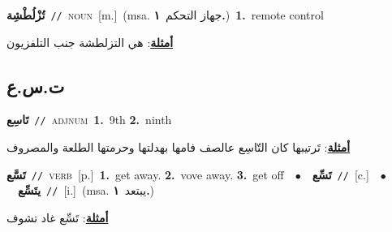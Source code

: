\documentclass[10pt,a4paper,twoside]{article} %
\begin{document}
\begin{multicols}{2}
{\setlength\topsep{0pt}\textbf{\foreignlanguage{arabic}{تُزْلُطْشِة}}\ {\color{gray}\texttt{//}\color{black}}\ \textsc{noun}\ [m.]\ \color{gray}(msa. \foreignlanguage{arabic}{جهاز التحكم}~\foreignlanguage{arabic}{\textbf{١.}})\color{black}\ \textbf{1.}~remote control\  \begin{flushright}\color{gray}\foreignlanguage{arabic}{\textbf{\underline{\foreignlanguage{arabic}{أمثلة}}}: هي التزلطشة جنب التلفزيون}\end{flushright}\color{black}} \vspace{2mm}

\vspace{-3mm}
\subsection*{\color{blue}\foreignlanguage{arabic}{ت.س.ع}\color{blue}{}} 

{\setlength\topsep{0pt}\textbf{\foreignlanguage{arabic}{تَاسِع}}\ {\color{gray}\texttt{//}\color{black}}\ \textsc{adj\textunderscore num}\ \textbf{1.}~9th  \textbf{2.}~ninth\  \begin{flushright}\color{gray}\foreignlanguage{arabic}{\textbf{\underline{\foreignlanguage{arabic}{أمثلة}}}: تَرتيبها كان التّاسِع عالصف فامها بهدلتها وحرمتها الطلعة والمصروف}\end{flushright}\color{black}} \vspace{2mm}

{\setlength\topsep{0pt}\textbf{\foreignlanguage{arabic}{تَسَّع}}\ {\color{gray}\texttt{//}\color{black}}\ \textsc{verb}\ [p.]\ \textbf{1.}~get away.  \textbf{2.}~vove away.  \textbf{3.}~get off\ \ $\bullet$\ \ \setlength\topsep{0pt}\textbf{\foreignlanguage{arabic}{تَسِّع}}\ {\color{gray}\texttt{//}\color{black}}\ [c.]\ \ $\bullet$\ \ \setlength\topsep{0pt}\textbf{\foreignlanguage{arabic}{يتَسِّع}}\ {\color{gray}\texttt{//}\color{black}}\ [i.]\ \color{gray}(msa. \foreignlanguage{arabic}{يبتعد}~\foreignlanguage{arabic}{\textbf{١.}})\color{black}\  \begin{flushright}\color{gray}\foreignlanguage{arabic}{\textbf{\underline{\foreignlanguage{arabic}{أمثلة}}}: تَسِّع غاد تشوف}\end{flushright}\color{black}} \vspace{2mm}


\end{multicols}
\end{document}
